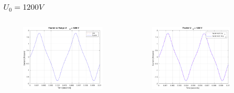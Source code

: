 \documentclass[aspectratio=1610]{beamer}
\begin{document}
\begin{frame}
\frametitle{$U_{0}= 1200V$}
	\begin{columns}
			\begin{figure}
				\includegraphics[scale=0.25]{figs/fourier vs rk4 1200.png}
			\end{figure}
			\begin{figure}
				\includegraphics[scale=0.25]{figs/fourier comparison 1200.png}
			\end{figure}
	\end{columns}
\end{frame}
\end{document}
